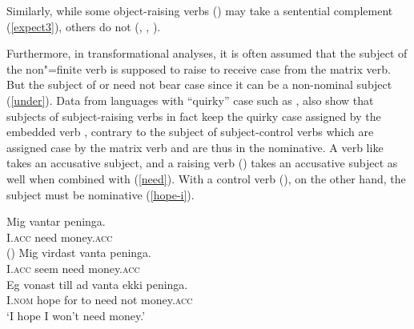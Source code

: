 \eal
{}
\zl
 
Similarly, while some object-raising verbs () may take a sentential complement (\ref{expect3}), others do not (, , ).
 
\eal
{}
\zl
\eal
{}
\zl

Furthermore, in transformational analyses, it is often assumed that the subject of the non"=finite verb  is supposed to raise to receive case from the matrix verb.
 But the subject of  or  need not bear case  since it can be a non-nominal subject (\ref{under}).
Data from languages with ``quirky'' case such as , also show that subjects of subject-raising verbs in fact keep the quirky case assigned by the embedded verb  \citep{Zaenenetal1985}, contrary to the subject of subject-control verbs which are assigned case by the matrix verb and are thus in the nominative. A verb like  takes an accusative subject, and a raising verb () takes an accusative subject as well when combined with  (\ref{need}). With a control verb (), on the other hand, the subject must be nominative (\ref{hope-i}).

\eal
\ex 
\gll Mig vantar peninga.\footnotemark\\
     I.\textsc{acc} need money.\textsc{acc} \\\hfill()
\ex 
\gll Mig virdast vanta peninga. \label{need} \\
     I.\textsc{acc} seem need money.\textsc{acc} \\
\ex 
\gll Eg vonast till ad vanta ekki peninga. \label{hope-i} \\
     I.\textsc{nom} hope for to need not money.\textsc{acc} \\
\glt `I hope I won't need money.'
\zl

